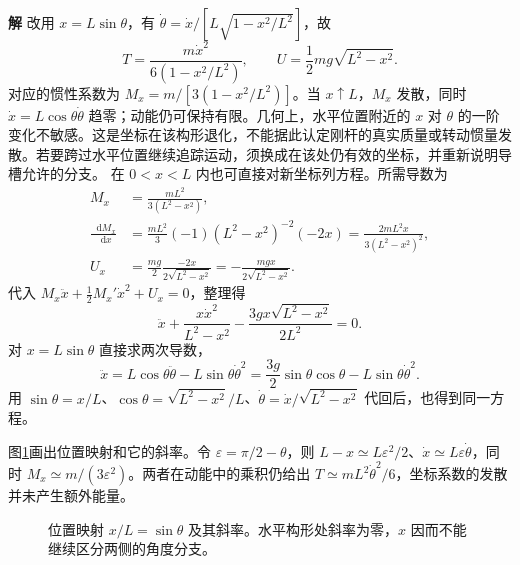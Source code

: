 \documentclass[11pt,openany,fontset=fandol]{ctexbook}
\theoremstyle{definition}\newtheorem{example}{例}[chapter]\newtheorem{exercise}{习题}[chapter]
\newcommand{\SolutionStart}{\par\medskip\ifdim\pagetotal>0pt\ifdim\dimexpr\pagegoal-\pagetotal\relax<3\baselineskip\newpage\fi\fi\noindent\textbf{解}\quad\ignorespaces}
\newenvironment{solution}{\SolutionStart}{\par\medskip}
\newcommand{\dd}{\mathop{}\!\mathrm d}\newcommand{\ee}{\mathrm e}\newcommand{\vct}[1]{\bm{#1}}
\begin{document}
\begin{solution}
改用 $x=L\sin\theta$，有 $\dot\theta=\dot x/[L\sqrt{1-x^2/L^2}]$，故
\[
T=\frac{m\dot x^2}{6(1-x^2/L^2)},\qquad
U=\frac12mg\sqrt{L^2-x^2}.
\]
对应的惯性系数为 $M_x=m/[3(1-x^2/L^2)]$。当 $x\uparrow L$，$M_x$ 发散，同时 $\dot x=L\cos\theta\dot\theta$ 趋零；动能仍可保持有限。几何上，水平位置附近的 $x$ 对 $\theta$ 的一阶变化不敏感。这是坐标在该构形退化，不能据此认定刚杆的真实质量或转动惯量发散。若要跨过水平位置继续追踪运动，须换成在该处仍有效的坐标，并重新说明导槽允许的分支。
在 $0<x<L$ 内也可直接对新坐标列方程。所需导数为
\[
\begin{aligned}
M_x&=\frac{mL^2}{3(L^2-x^2)},\\
\frac{\dd M_x}{\dd x}
&=\frac{mL^2}{3}(-1)(L^2-x^2)^{-2}(-2x)
=\frac{2mL^2x}{3(L^2-x^2)^2},\\
U_x&=\frac{mg}{2}\frac{-2x}{2\sqrt{L^2-x^2}}
=-\frac{mgx}{2\sqrt{L^2-x^2}}.
\end{aligned}
\]
代入 $M_x\ddot x+\tfrac12M_x'\dot x^2+U_x=0$，整理得
\[
\ddot x+\frac{x\dot x^2}{L^2-x^2}
-\frac{3gx\sqrt{L^2-x^2}}{2L^2}=0.
\]
对 $x=L\sin\theta$ 直接求两次导数，
\[
\ddot x=L\cos\theta\ddot\theta-L\sin\theta\dot\theta^2
=\frac{3g}{2}\sin\theta\cos\theta-L\sin\theta\dot\theta^2.
\]
用 $\sin\theta=x/L$、$\cos\theta=\sqrt{L^2-x^2}/L$、$\dot\theta=\dot x/\sqrt{L^2-x^2}$ 代回后，也得到同一方程。

图\ref{mp5:fig:l5-e3-coordinate}画出位置映射和它的斜率。令 $\varepsilon=\pi/2-\theta$，则 $L-x\simeq L\varepsilon^2/2$、$\dot x\simeq L\varepsilon\dot\theta$，同时 $M_x\simeq m/(3\varepsilon^2)$。两者在动能中的乘积仍给出 $T\simeq mL^2\dot\theta^2/6$，坐标系数的发散并未产生额外能量。
\begin{figure}[H]\centering
{}
\caption{位置映射 $x/L=\sin\theta$ 及其斜率。水平构形处斜率为零，$x$ 因而不能继续区分两侧的角度分支。}\label{mp5:fig:l5-e3-coordinate}
\end{figure}

\end{solution}
\end{document}
